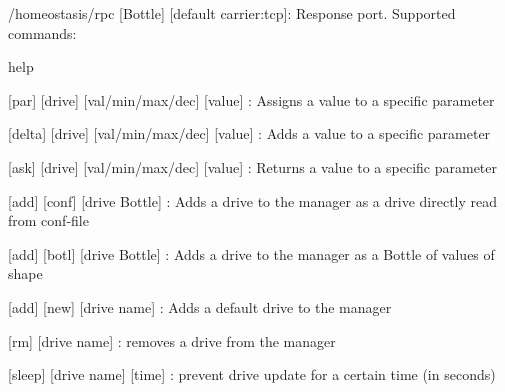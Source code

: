 \begin{DoxyItemize}
\item /homeostasis/rpc \mbox{[}Bottle\mbox{]} \mbox{[}default carrier\+:tcp\mbox{]}\+: Response port. Supported commands\+:
\begin{DoxyItemize}
\item help
\item \mbox{[}\textquotesingle{}par\textquotesingle{}\mbox{]} \mbox{[}\textquotesingle{}drive\textquotesingle{}\mbox{]} \mbox{[}\textquotesingle{}val\textquotesingle{}/\textquotesingle{}min\textquotesingle{}/\textquotesingle{}max\textquotesingle{}/\textquotesingle{}dec\textquotesingle{}\mbox{]} \mbox{[}value\mbox{]} \+: Assigns a value to a specific parameter
\item \mbox{[}\textquotesingle{}delta\textquotesingle{}\mbox{]} \mbox{[}\textquotesingle{}drive\textquotesingle{}\mbox{]} \mbox{[}\textquotesingle{}val\textquotesingle{}/\textquotesingle{}min\textquotesingle{}/\textquotesingle{}max\textquotesingle{}/\textquotesingle{}dec\textquotesingle{}\mbox{]} \mbox{[}value\mbox{]} \+: Adds a value to a specific parameter
\item \mbox{[}\textquotesingle{}ask\textquotesingle{}\mbox{]} \mbox{[}\textquotesingle{}drive\textquotesingle{}\mbox{]} \mbox{[}\textquotesingle{}val\textquotesingle{}/\textquotesingle{}min\textquotesingle{}/\textquotesingle{}max\textquotesingle{}/\textquotesingle{}dec\textquotesingle{}\mbox{]} \mbox{[}value\mbox{]} \+: Returns a value to a specific parameter
\item \mbox{[}\textquotesingle{}add\textquotesingle{}\mbox{]} \mbox{[}\textquotesingle{}conf\textquotesingle{}\mbox{]} \mbox{[}drive Bottle\mbox{]} \+: Adds a drive to the manager as a drive directly read from conf-\/file
\item \mbox{[}\textquotesingle{}add\textquotesingle{}\mbox{]} \mbox{[}\textquotesingle{}botl\textquotesingle{}\mbox{]} \mbox{[}drive Bottle\mbox{]} \+: Adds a drive to the manager as a Bottle of values of shape
\item \mbox{[}\textquotesingle{}add\textquotesingle{}\mbox{]} \mbox{[}\textquotesingle{}new\textquotesingle{}\mbox{]} \mbox{[}drive name\mbox{]} \+: Adds a default drive to the manager
\item \mbox{[}\textquotesingle{}rm\textquotesingle{}\mbox{]} \mbox{[}drive name\mbox{]} \+: removes a drive from the manager
\item \mbox{[}\textquotesingle{}sleep\textquotesingle{}\mbox{]} \mbox{[}drive name\mbox{]} \mbox{[}time\mbox{]} \+: prevent drive update for a certain time (in seconds)

\end{DoxyItemize}
\end{DoxyItemize}
